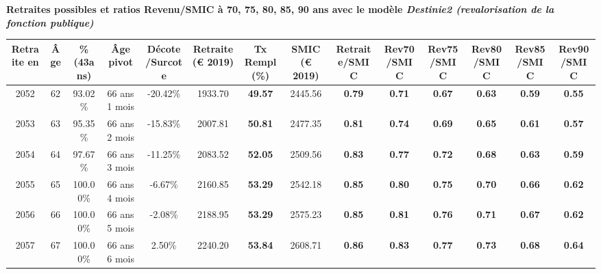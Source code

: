  \vspace{0.1cm} 
{\bf \noindent Retraites possibles et ratios Revenu/SMIC à 70, 75, 80, 85, 90 ans avec le modèle \emph{Destinie2 (revalorisation de la fonction publique)}}  
 
\begin{adjustbox}{max width=\textwidth} 
\begin{tabular}[htb]{|c|c||c|c|c||c|c||c||c|c|c|c|c|c|} 
\hline 
 Retraite en &  Âge &  \%(43ans) &  Âge pivot &  Décote/Surcote &  Retraite (\euro{} 2019) &  Tx Rempl(\%) &  SMIC (\euro{} 2019) &  Retraite/SMIC &  Rev70/SMIC &  Rev75/SMIC &  Rev80/SMIC &  Rev85/SMIC &  Rev90/SMIC \\ 
\hline \hline 
 2052 &  62 &  93.02\% &  66 ans 1 mois &  -20.42\% &  1933.70 &  {\bf 49.57} &  2445.56 &  {\bf {\color{red} 0.79}} &  {\bf {\color{red} 0.71}} &  {\bf {\color{red} 0.67}} &  {\bf {\color{red} 0.63}} &  {\bf {\color{red} 0.59}} &  {\bf {\color{red} 0.55}} \\ 
\hline 
 2053 &  63 &  95.35\% &  66 ans 2 mois &  -15.83\% &  2007.81 &  {\bf 50.81} &  2477.35 &  {\bf {\color{red} 0.81}} &  {\bf {\color{red} 0.74}} &  {\bf {\color{red} 0.69}} &  {\bf {\color{red} 0.65}} &  {\bf {\color{red} 0.61}} &  {\bf {\color{red} 0.57}} \\ 
\hline 
 2054 &  64 &  97.67\% &  66 ans 3 mois &  -11.25\% &  2083.52 &  {\bf 52.05} &  2509.56 &  {\bf {\color{red} 0.83}} &  {\bf {\color{red} 0.77}} &  {\bf {\color{red} 0.72}} &  {\bf {\color{red} 0.68}} &  {\bf {\color{red} 0.63}} &  {\bf {\color{red} 0.59}} \\ 
\hline 
 2055 &  65 &  100.00\% &  66 ans 4 mois &  -6.67\% &  2160.85 &  {\bf 53.29} &  2542.18 &  {\bf {\color{red} 0.85}} &  {\bf {\color{red} 0.80}} &  {\bf {\color{red} 0.75}} &  {\bf {\color{red} 0.70}} &  {\bf {\color{red} 0.66}} &  {\bf {\color{red} 0.62}} \\ 
\hline 
 2056 &  66 &  100.00\% &  66 ans 5 mois &  -2.08\% &  2188.95 &  {\bf 53.29} &  2575.23 &  {\bf {\color{red} 0.85}} &  {\bf {\color{red} 0.81}} &  {\bf {\color{red} 0.76}} &  {\bf {\color{red} 0.71}} &  {\bf {\color{red} 0.67}} &  {\bf {\color{red} 0.62}} \\ 
\hline 
 2057 &  67 &  100.00\% &  66 ans 6 mois &  2.50\% &  2240.20 &  {\bf 53.84} &  2608.71 &  {\bf {\color{red} 0.86}} &  {\bf {\color{red} 0.83}} &  {\bf {\color{red} 0.77}} &  {\bf {\color{red} 0.73}} &  {\bf {\color{red} 0.68}} &  {\bf {\color{red} 0.64}} \\ 
\hline 
\hline 
\end{tabular} 
\end{adjustbox} 
 
